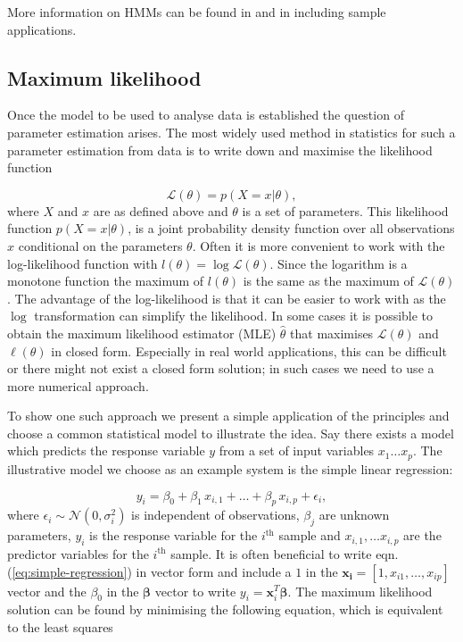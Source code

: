 More information on HMMs can be found in \cite{MacDonald:1997wm} and in \cite{Zucchini:2009vl} including sample applications.


\subsection{Maximum likelihood}
\label{sec:least-squares}

Once the model to be used to analyse data is established the question of parameter estimation arises. The most widely used method in statistics for such a parameter estimation from data is  to write down and maximise the likelihood function

\begin{equation}
  \mathcal{L}(\theta) = p(X = x| \theta) ,
\end{equation}
where $X$ and $x$ are as defined above and $\theta$ is a set of parameters. This likelihood function $p(X = x|\theta)$, is a joint probability density function over all observations $x$ conditional on the parameters $\theta$.  Often it is more convenient to work with the log-likelihood function with $l(\theta) = \log \mathcal{L}(\theta)$. Since the logarithm is a monotone function the maximum of $l (\theta)$ is the same as the maximum of $\mathcal{L} (\theta)$. The advantage of the log-likelihood is that it can be easier to work with as the $\log$ transformation can simplify the likelihood. In some cases it is possible to obtain the maximum likelihood estimator (MLE) $\hat{\theta}$ that maximises $\mathcal{L}(\theta)$ and $\ell (\theta)$ in closed form. Especially in real world applications, this can be difficult or there might not exist a closed form solution; in such cases we need to use a more numerical approach.

To show one such approach we present a simple application of the principles and choose a common statistical model to illustrate the idea. Say there exists a model which predicts the response variable $y$ from a set of input variables $x_1 \ldots x_p$. The illustrative model we choose as an example system is the simple linear regression:

\begin{equation}
  \label{eq:simple-regression}
  y_i = \beta_0 + \beta_1 \, x_{i,1}  + \ldots +\beta_p \, x_{i,p}+ \epsilon_i,
\end{equation}
where $\epsilon_i \sim \mathcal{N}(0, \sigma_i^2)$ is independent of observations, $\beta_j$ are unknown parameters, $y_i$ is the response variable for the $i^{\text{th}}$ sample and $x_{i,1}, \ldots x_{i,p} $ are the predictor variables for the $i^{\text{th}} $ sample. It is often beneficial to write eqn. (\ref{eq:simple-regression}) in vector form and include a $1$ in the $\mathbf{x_{i}} = [1, x_{i1}, \ldots , x_{ip}]$ vector and the $\beta_0$ in the $\mathbf{\beta}$ vector to write $y_i = \mathbf{x}_i^T \mathbf{\beta}$. The maximum likelihood solution can be found by minimising the following equation, which is equivalent to the least squares

